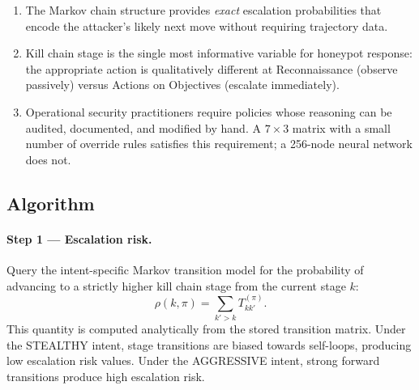 \begin{enumerate}
  \item The Markov chain structure provides \emph{exact} escalation
        probabilities that encode the attacker's likely next move without
        requiring trajectory data.
  \item Kill chain stage is the single most informative variable for
        honeypot response: the appropriate action is qualitatively
        different at Reconnaissance (observe passively) versus
        Actions on Objectives (escalate immediately).
  \item Operational security practitioners require policies whose reasoning
        can be audited, documented, and modified by hand.
        A $7 \times 3$ matrix with a small number of override rules
        satisfies this requirement; a 256-node neural network does not.
\end{enumerate}

\subsection{Algorithm}
\label{sec:sedm_alg}

\paragraph{Step 1 — Escalation risk.}
Query the intent-specific Markov transition model for the probability of
advancing to a strictly higher kill chain stage from the current stage $k$:
%
\begin{equation}
  \rho(k, \pi) = \sum_{k' > k} T^{(\pi)}_{kk'}.
  \label{eq:esc_risk_meth}
\end{equation}
%
This quantity is computed analytically from the stored transition matrix.
Under the STEALTHY intent, stage transitions are biased towards self-loops,
producing low escalation risk values.
Under the AGGRESSIVE intent, strong forward transitions produce high
escalation risk.

